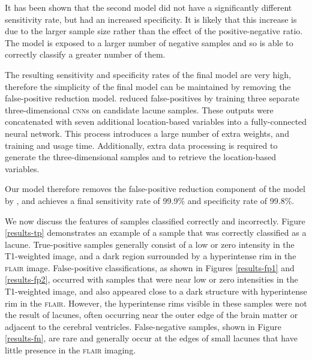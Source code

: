 It has been shown that the second model did not have a significantly different sensitivity rate, but had an increased specificity. It is likely that this increase is due to the larger sample size rather than the effect of the positive-negative ratio. The model is exposed to a larger number of negative samples and so is able to correctly classify a greater number of them.

The resulting sensitivity and specificity rates of the final model are very high, therefore the simplicity of the final model can be maintained by removing the false-positive reduction model. \citep{GhafoorianM.2017Dml3} reduced false-positives by training three separate three-dimensional \textsc{cnn}s on candidate lacune samples. These outputs were concatenated with seven additional location-based variables into a fully-connected neural network. This process introduces a large number of extra weights, and training and usage time. Additionally, extra data processing is required to generate the three-dimensional samples and to retrieve the location-based variables.

Our model therefore removes the false-positive reduction component of the model by \cite{GhafoorianM.2017Dml3}, and achieves a final sensitivity rate of 99.9\% and specificity rate of 99.8\%.

We now discuss the features of samples classified correctly and incorrectly. Figure \ref{results-tp} demonstrates an example of a sample that was correctly classified as a lacune. True-positive samples generally consist of a low or zero intensity in the T1-weighted image, and a dark region surrounded by a hyperintense rim in the \textsc{flair} image. False-positive classifications, as shown in Figures \ref{results-fp1} and \ref{results-fp2}, occurred with samples that were near low or zero intensities in the T1-weighted image, and also appeared close to a dark structure with hyperintense rim in the \textsc{flair}. However, the hyperintense rims visible in these samples were not the result of lacunes, often occurring near the outer edge of the brain matter or adjacent to the cerebral ventricles. False-negative samples, shown in Figure \ref{results-fn}, are rare and generally occur at the edges of small lacunes that have little presence in the \textsc{flair} imaging.

